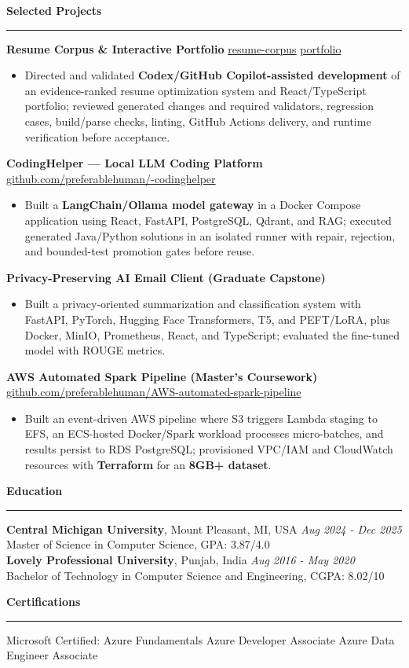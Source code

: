 \documentclass[11pt,letterpaper]{article}
\newcommand{\ressection}[1]{\Needspace{6\baselineskip}\vspace{8pt}\par\textbf{#1}\par\vspace{2pt}\hrule\vspace{5pt}}
\begin{document}
\ressection{Selected Projects}
\textbf{Resume Corpus \& Interactive Portfolio} \hfill \href{https://github.com/preferablehuman/resume-corpus}{resume-corpus} \textbar{} \href{https://github.com/preferablehuman/portfolio}{portfolio}
\begin{itemize}
  \item Directed and validated \textbf{Codex/GitHub Copilot-assisted development} of an evidence-ranked resume optimization system and React/TypeScript portfolio; reviewed generated changes and required validators, regression cases, build/parse checks, linting, GitHub Actions delivery, and runtime verification before acceptance.
\end{itemize}
\vskip 6pt
\textbf{CodingHelper --- Local LLM Coding Platform} \hfill \href{https://github.com/preferablehuman/-codinghelper}{github.com/preferablehuman/-codinghelper}
\begin{itemize}
  \item Built a \textbf{LangChain/Ollama model gateway} in a Docker Compose application using React, FastAPI, PostgreSQL, Qdrant, and RAG; executed generated Java/Python solutions in an isolated runner with repair, rejection, and bounded-test promotion gates before reuse.
\end{itemize}
\vskip 6pt
\textbf{Privacy-Preserving AI Email Client (Graduate Capstone)}
\begin{itemize}
  \item Built a privacy-oriented summarization and classification system with FastAPI, PyTorch, Hugging Face Transformers, T5, and PEFT/LoRA, plus Docker, MinIO, Prometheus, React, and TypeScript; evaluated the fine-tuned model with ROUGE metrics.
\end{itemize}
\vskip 6pt
\textbf{AWS Automated Spark Pipeline (Master's Coursework)} \hfill \href{https://github.com/preferablehuman/AWS-automated-spark-pipeline}{github.com/preferablehuman/AWS-automated-spark-pipeline}
\begin{itemize}
  \item Built an event-driven AWS pipeline where S3 triggers Lambda staging to EFS, an ECS-hosted Docker/Spark workload processes micro-batches, and results persist to RDS PostgreSQL; provisioned VPC/IAM and CloudWatch resources with \textbf{Terraform} for an \textbf{8GB+ dataset}.
\end{itemize}

\ressection{Education}
\textbf{Central Michigan University}, Mount Pleasant, MI, USA \hfill \textit{Aug 2024 - Dec 2025}\\
Master of Science in Computer Science, GPA: 3.87/4.0\\[2pt]
\textbf{Lovely Professional University}, Punjab, India \hfill \textit{Aug 2016 - May 2020}\\
Bachelor of Technology in Computer Science and Engineering, CGPA: 8.02/10

\ressection{Certifications}
Microsoft Certified: Azure Fundamentals \textbar{} Azure Developer Associate \textbar{} Azure Data Engineer Associate
\end{document}
